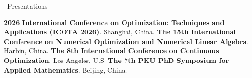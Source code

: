 \begin{rubric}{\faTv\ Presentations}

%
\entry*[2026/04] 
    \textbf{2026 International Conference on Optimization: Techniques and Applications (ICOTA 2026)}. Shanghai, China.
\entry*[2025/08] 
    \textbf{The 15th International Conference on Numerical Optimization and Numerical Linear Algebra}. Harbin, China.
\entry*[2025/07] 
    \textbf{The 8th International Conference on Continuous Optimization}. Los Angeles, U.S.
\entry*[2024/11] 
    \textbf{The 7th PKU PhD Symposium for Applied Mathematics}. Beijing, China.

\end{rubric}